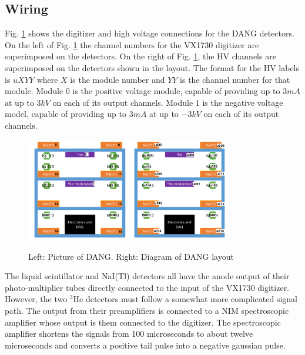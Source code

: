 \documentclass[onecolumn, 10pt, letterpaper, twoside]{article}
\newcommand{\nuc}[2] {$^{#1}$#2}
\begin{document}
\subsection{Wiring}
Fig. \ref{fig:DANG-Wiring} shows the digitizer and high voltage connections for the DANG detectors. On the left of Fig. \ref{fig:DANG-Wiring} the channel numbers for the VX1730 digitizer are superimposed on the detectors. On the right of Fig. \ref{fig:DANG-Wiring}, the HV channels are superimposed on the detectors shown in the layout. The format for the HV labels is $uXYY$ where $X$ is the module number and $YY$ is the channel number for that module. Module $0$ is the positive voltage module, capable of providing up to $3mA$ at up to $3kV$ on each of its output channels. Module $1$ is the negative voltage model, capable of providing up to $3mA$ at up to $-3kV$ on each of its output channels.

\begin{figure}[h!]
\begin{center}
\includegraphics[width=0.4\textwidth]{./DANG_Layout_Digi_Chans.png}\includegraphics[width=0.4\textwidth]{./DANG_Layout_HV_chans.png}
\caption{Left: Picture of DANG. Right: Diagram of DANG layout}
\label{fig:DANG-Wiring}
\end{center}
\end{figure}

The liquid scintillator and NaI(Tl) detectors all have the anode output of their photo-multiplier tubes directly connected to the input of the VX1730 digitizer. However, the two \nuc{3}{He} detectors must follow a somewhat more complicated signal path. The output from their preamplifiers is connected to a NIM spectroscopic amplifier whose output is them connected to the digitizer. The spectroscopic amplifier shortens the signals from 100 microseconds to about twelve microseconds and converts a positive tail pulse into a negative gaussian pulse.
\end{document}
